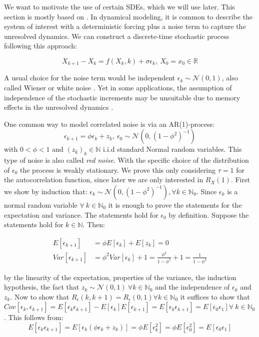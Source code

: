 \documentclass[%
thesis=student,%
coverpage=false,%
titlepage=false,%
headmarks=true, %
english,%
font=libertine, %
math=newpxtx, %
BCOR=5mm,%
coverBCOR=11mm%
]{tumbook}
\begin{document}
We want to motivate the use of certain SDEs, which we will use later. This section is mostly based on \cite{Morr:2022}.
In dynamical modeling, it is common to describe the system of interest with a deterministic forcing plus a noise term to capture the unresolved dynamics. We can construct a discrete-time stochastic process following this approach:

\begin{equation}
    X_{k+1}-X_{k} = f(X_{k},k) + \sigma\epsilon_{k}, \ X_{0} = x_{0} \in \mathbb{R}
    \label{eq:discrete-time modelling}
\end{equation}

A usual choice for the noise term would be independent $\epsilon_{k} \sim \mathcal{N}(0,1)$, also called Wiener or white noise \cite{zwanzig:2001}.
Yet in some applications, the assumption of independence of the stochastic increments may be unsuitable due to memory effects in the unresolved dynamics \cite{zwanzig:1961,chorin:2000}.

One common way to model correlated noise is via an AR(1)-process:
\[
\epsilon_{k+1} = \phi\epsilon_{k} + z_{k}, \ \epsilon_{0} \sim \mathcal{N}(0,(1-\phi^2)^{-1})
\]
with $0<\phi<1$ and $(z_{k})_{k}\in\mathbb{N}$ i.i.d standard Normal random variables. This type of noise is also called \textit{red noise}. With the specific choice of the distribution of $\epsilon_{0}$ the process is weakly stationary. We prove this only considering $\tau = 1$ for the autocorrelation function, since later we are only interested in $R_{X}(1)$. First we show by induction that: $\epsilon_{k} \sim \mathcal{N}(0,(1-\phi^2)^{-1}), \forall k \in \mathbb{N}_{0}$. Since $\epsilon_{k}$ is a normal random variable $\forall \ k \in \mathbb{N}_{0}$ it is enough to prove the statements for the expectation and variance. The statements hold for $\epsilon_{0}$ by definition. Suppose the statements hold for $k \in \mathbb{N}$. Then:

\begin{subequations}
    \begin{align}
        E[\epsilon_{k+1}] &= \phi E[\epsilon_{k}] + E[z_{k}]  = 0 \\
        Var[\epsilon_{k+1}] &= \phi^2 Var[\epsilon_{k}] + 1 = \frac{\phi^2}{1-\phi^2} + 1 = \frac{1}{1-\phi^2}     
    \end{align}
\end{subequations}   

by the linearity of the expectation, properties of the variance, the induction hypothesis, the fact that $z_{k} \sim \mathcal{N}(0,1) \ \forall k \in \mathbb{N}_{0}$ and the independence of $\epsilon_{k}$ and $z_{k}$. Now to show that $R_{\epsilon}(k,k+1) = R_{\epsilon}(0,1) \forall k \in \mathbb{N}_{0}$ it suffices to show that $Cov[\epsilon_{k},\epsilon_{k+1}] = E[\epsilon_{k}\epsilon_{k+1}] - E[\epsilon_{k}]E[\epsilon_{k+1}] = E[\epsilon_{k}\epsilon_{k+1}] = E[\epsilon_{0}\epsilon_{1}] \forall \ k \in \mathbb{N}_{0}$. This follows from: 
\[
E[\epsilon_{k}\epsilon_{k+1}] = E[\epsilon_{k}(\phi\epsilon_{k} + z_{k})] = \phi E[\epsilon_{k}^2] = \phi E[\epsilon_{0}^2] = E[\epsilon_{0}\epsilon_{1}]
\]
\end{document}
